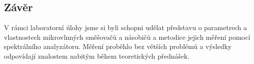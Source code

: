 \documentclass[11pt,a4paper]{article}
\begin{document}
\subsection*{Závěr}
V rámci laboratorní úlohy jsme si byli schopni udělat představu o parametrech a vlastnostech mikrovlnných směšovačů a násobičů a metodice jejich měření pomocí spektrálního analyzátoru. Měření proběhlo bez větších problémů a výsledky odpovídají znalostem nabitým během teoretických přednášek.
\end{document}
